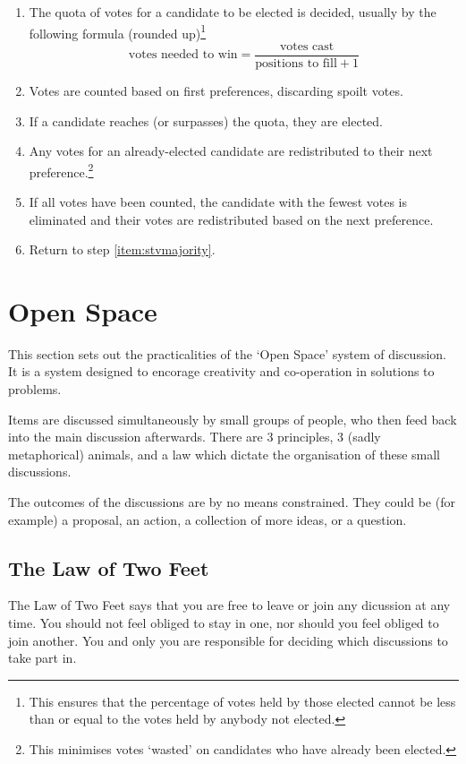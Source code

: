 \documentclass[a4paper, 11pt]{article} %
\begin{document}
\begin{enumerate}
\item The quota of votes for a candidate to be elected is decided, usually by the following formula (rounded up)\footnote{This ensures that the percentage of votes held by those elected cannot be less than or equal to the votes held by anybody not elected.} \[\mbox{votes needed to win} = \frac{\mbox{votes cast}}{\mbox{positions to fill}+ 1} \]
\item Votes are counted based on first preferences, discarding spoilt votes.
\item \label{item:stvmajority} If a candidate reaches (or surpasses) the quota, they are elected.
\item Any votes for an already-elected candidate are redistributed to their next preference.\footnote{This minimises votes `wasted' on candidates who have already been elected.}
\item If all votes have been counted, the candidate with the fewest votes is eliminated and their votes are redistributed based on the next preference.
\item Return to step \ref{item:stvmajority}.
\end{enumerate}

\appendix

\section{Open Space}
\label{sec:openspace}
This section sets out the practicalities of the `Open Space' system of discussion.  It is a system designed to encorage creativity and co-operation in solutions to problems.

Items are discussed simultaneously by small groups of people, who then feed back into the main discussion afterwards.  There are 3 principles, 3 (sadly metaphorical) animals, and a law which dictate the organisation of these small discussions.

The outcomes of the discussions are by no means constrained.  They could be (for example) a proposal, an action, a collection of more ideas, or a question.

\subsection{The Law of Two Feet}
The Law of Two Feet says that you are free to leave or join any dicussion at any time.  You should not feel obliged to stay in one, nor should you feel obliged to join another.  You and only you are responsible for deciding which discussions to take part in.
\end{document}
